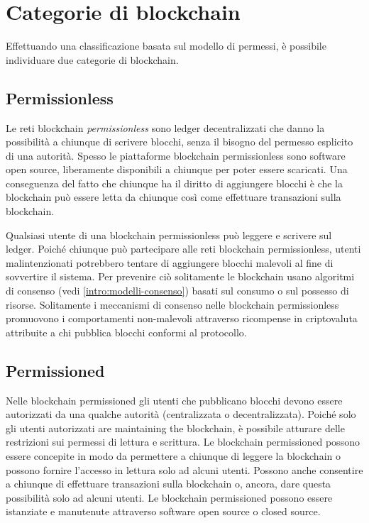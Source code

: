 \section{Categorie di blockchain}
Effettuando una classificazione basata sul modello di permessi,
è possibile individuare due categorie di blockchain.

\subsection{Permissionless}
Le reti blockchain \textit{permissionless} sono ledger decentralizzati che danno la possibilità
a chiunque di scrivere blocchi, senza il bisogno del permesso esplicito di una autorità.
Spesso le piattaforme blockchain permissionless sono software open source, liberamente
disponibili a chiunque per poter essere scaricati. Una conseguenza del fatto che
chiunque ha il diritto di aggiungere blocchi è che la blockchain può essere letta da chiunque
così come effettuare transazioni sulla blockchain.

Qualsiasi utente di una blockchain permissionless può leggere e scrivere sul ledger.
Poiché chiunque può partecipare alle reti blockchain permissionless, utenti malintenzionati
potrebbero tentare di aggiungere blocchi malevoli al fine di sovvertire il sistema.
Per prevenire ciò solitamente le blockchain usano algoritmi di consenso
(vedi \ref{intro:modelli-consenso}) basati sul consumo o sul possesso di risorse.
Solitamente i meccanismi di consenso nelle blockchain
permissionless promuovono i comportamenti non-malevoli attraverso ricompense in criptovaluta
attribuite a chi pubblica blocchi conformi al protocollo.

\subsection{Permissioned}
Nelle blockchain permissioned gli utenti che pubblicano blocchi devono essere autorizzati da una
qualche autorità (centralizzata o decentralizzata). Poiché solo gli utenti autorizzati are maintaining
the blockchain, è possibile atturare delle restrizioni sui permessi di lettura e scrittura.
Le blockchain permissioned possono essere concepite in modo da permettere a chiunque di
leggere la blockchain o possono fornire l'accesso in lettura solo ad alcuni utenti.
Possono anche consentire a chiunque di effettuare transazioni sulla blockchain o, ancora,
dare questa possibilità solo ad alcuni utenti. Le blockchain permissioned possono essere
istanziate e manutenute attraverso software open source o closed source.

